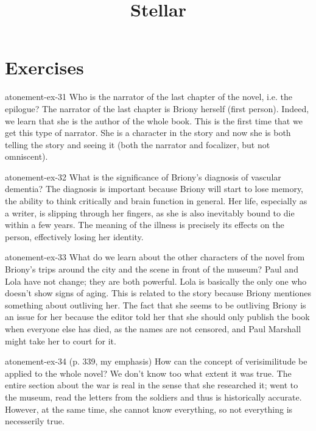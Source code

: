 \documentclass[preview]{standalone}
\begin{document}
\title{Stellar}
\genpage

\section{Exercises}

\begin{snippetexercise}{atonement-ex-31}
    {Who is the narrator of the last chapter of the novel, i.e. the epilogue?}
    The narrator of the last chapter is Briony herself (first person).
    Indeed, we learn that she is the author of the whole book.
    This is the first time that we get this type of narrator.
    She is a character in the story and now she is both telling the story and seeing it
    (both the narrator and focalizer, but not omniscent).
\end{snippetexercise}

\begin{snippetexercise}{atonement-ex-32}
    {What is the significance of Briony's diagnosis of vascular dementia?}
    The diagnosis is important because Briony will start to lose memory, the ability to
    think critically and brain function in general. Her life,
    especially as a writer, is slipping through her fingers,
    as she is also inevitably bound to die within a few years.
    The meaning of the illness is precisely its effects on the person,
    effectively losing her identity.
\end{snippetexercise}

\begin{snippetexercise}{atonement-ex-33}
    {What do we learn about the other characters of the novel from Briony's trips around the city and
    the scene in front of the museum?}
    Paul and Lola have not change; they are both powerful.
    Lola is basically the only one who doesn't show signs of aging.
    This is related to the story because Briony mentiones something about outliving her.
    The fact that she seems to be outliving Briony is an issue for her because
    the editor told her that she should only publish the book when everyone else has died,
    as the names are not censored, and Paul Marshall might take her to court for it.
\end{snippetexercise}

\begin{snippetexercise}{atonement-ex-34}
    { (p. 339, my emphasis) How can the concept of verisimilitude
    be applied to the whole novel?}
    We don't know too what extent it was true.
    The entire section about the war is real in the sense that she researched it;
    went to the museum, read the letters from the soldiers and thus is historically accurate.
    However, at the same time, she cannot know everything, so not everything is necesserily true.
\end{snippetexercise}
\end{document}
